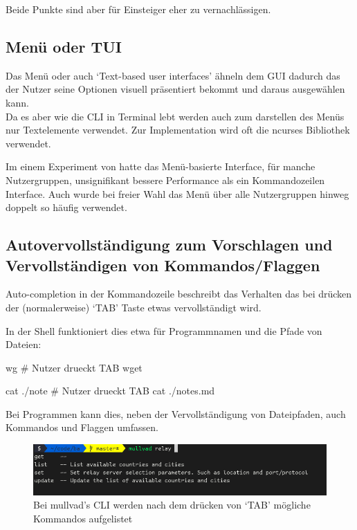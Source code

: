 \documentclass[oneside,bibliography=totocnumbered,BCOR=5mm]{scrbook}
\newenvironment{code}{\captionsetup{type=listing, skip=0pt}}{}
\begin{document}
Beide Punkte sind aber für Einsteiger eher zu vernachlässigen.

\subsection{Menü oder TUI}

Das Menü oder auch `Text-based user interfaces' ähneln dem GUI dadurch das der
Nutzer seine Optionen visuell präsentiert bekommt und daraus ausgewählen kann.
\\
Da es aber wie die CLI in Terminal lebt werden auch zum darstellen des Menüs
nur Textelemente verwendet. Zur Implementation wird oft die ncurses Bibliothek
verwendet.

\bigskip

Im einem Experiment von \cite{Westerman_1997} hatte das Menü-basierte
Interface, für manche Nutzergruppen, unsignifikant bessere Performance als
ein Kommandozeilen Interface. Auch wurde bei freier Wahl das Menü über alle
Nutzergruppen hinweg doppelt so häufig verwendet.



\subsection{Autovervollständigung zum Vorschlagen und Vervollständigen von Kommandos/Flaggen}

Auto-completion in der Kommandozeile beschreibt das Verhalten das bei drücken der
(normalerweise) `TAB' Taste etwas vervollständigt wird.

In der Shell funktioniert dies etwa für Programmnamen und die Pfade von Dateien:
\begin{code}
  \begin{shellcode}
wg # Nutzer drueckt TAB
wget

cat ./note # Nutzer drueckt TAB
cat ./notes.md
  \end{shellcode}
  \medskip
\end{code}

Bei Programmen kann dies, neben der Vervollständigung von Dateipfaden, auch
Kommandos und Flaggen umfassen.

\begin{figure}
  \centering
  \includegraphics[scale=0.5]{mullvad-autocomplete.png}
  \caption{Bei mullvad's CLI werden nach dem drücken von `TAB' mögliche Kommandos aufgelistet}
  \label{fig:autocomplete}
\end{figure}
\end{document}
